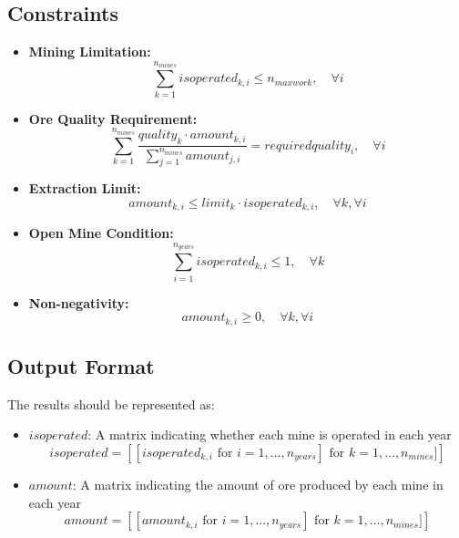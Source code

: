 \documentclass{article}
\begin{document}
\subsection*{Constraints}
\begin{itemize}
    \item \textbf{Mining Limitation:}
    \[
    \sum_{k=1}^{n_{mines}} isoperated_{k,i} \leq n_{maxwork}, \quad \forall i
    \]

    \item \textbf{Ore Quality Requirement:}
    \[
    \sum_{k=1}^{n_{mines}} \frac{quality_k \cdot amount_{k,i}}{\sum_{j=1}^{n_{mines}} amount_{j,i}} = requiredquality_i, \quad \forall i
    \]
    
    \item \textbf{Extraction Limit:}
    \[
    amount_{k,i} \leq limit_k \cdot isoperated_{k,i}, \quad \forall k, \forall i
    \]

    \item \textbf{Open Mine Condition:}
    \[
    \sum_{i=1}^{n_{years}} isoperated_{k,i} \leq 1, \quad \forall k
    \]
    
    \item \textbf{Non-negativity:}
    \[
    amount_{k,i} \geq 0, \quad \forall k, \forall i
    \]
\end{itemize}

\subsection*{Output Format}
The results should be represented as:
\begin{itemize}
    \item $isoperated$: A matrix indicating whether each mine is operated in each year
    \[
    isoperated = \left[ [isoperated_{k,i} \text{ for } i = 1,\ldots,n_{years} ] \text{ for } k = 1,\ldots,n_{mines}] \right]
    \]
    
    \item $amount$: A matrix indicating the amount of ore produced by each mine in each year
    \[
    amount = \left[ [amount_{k,i} \text{ for } i = 1,\ldots,n_{years} ] \text{ for } k = 1,\ldots,n_{mines}] \right]
    \]
\end{itemize}
\end{document}
